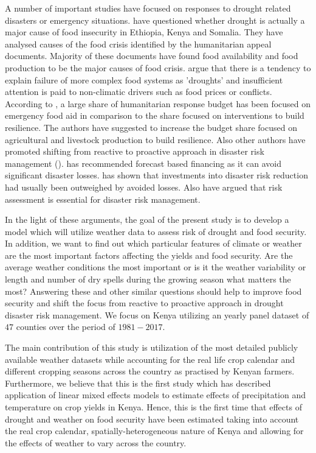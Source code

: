 \documentclass[a4paper,12pt]{article}
\begin{document}
A number of important studies have focused on responses to drought related disasters or emergency situations. \cite{Sandstorm2017} have questioned whether drought is actually a major cause of food insecurity in Ethiopia, Kenya and Somalia. They have analysed causes of the food crisis identified by the humanitarian appeal documents. Majority of these documents have found food availability and food production to be the major causes of food crisis. \cite{Sandstorm2017} argue that there is a tendency to explain failure of more complex food systems as 'droughts' and insufficient attention is paid to non-climatic drivers such as food prices or conflicts. According to \cite{Sandstorm2017}, a large share of humanitarian response budget has been focused on emergency food aid in comparison to the share focused on interventions to build resilience. The authors have suggested to increase the budget share focused on agricultural and livestock production to build resilience. Also other authors have promoted shifting from reactive to proactive approach in disaster risk management (\citealp{Mechler2005,IPCC2012ch1,Nicholson2017}).  \cite{Nicholson2017} has recommended forecast based financing as it can avoid significant disaster losses. \cite{Mechler2005} has shown that investments into disaster risk reduction had usually been outweighed by avoided losses. Also \cite{IPCC2012ch1} have argued that risk assessment is essential for disaster risk management.

In the light of these arguments, the goal of the present study is to develop a model which will utilize weather data to assess risk of drought and food security. In addition, we want to find out which particular features of climate or weather are the most important factors affecting the yields and food security. Are the average weather conditions the most important or is it the weather variability or length and number of dry spells during the growing season what matters the most? Answering these and other similar questions should help to improve food security and shift the focus from reactive to proactive approach in drought disaster risk management. We focus on Kenya utilizing an yearly panel dataset of $47$ counties over the period of $1981-2017$. %


The main contribution of this study is utilization of the most detailed publicly available weather datasets while accounting for the real life crop calendar and different cropping seasons across the country as practised by Kenyan farmers. Furthermore, we believe that this is the first study which has described application of linear mixed effects models to estimate effects of precipitation and temperature on crop yields in Kenya. Hence, this is the first time that effects of drought and weather on food security have been estimated taking into account the real crop calendar, spatially-heterogeneous nature of Kenya and allowing for the effects of weather to vary across the country.
\end{document}
